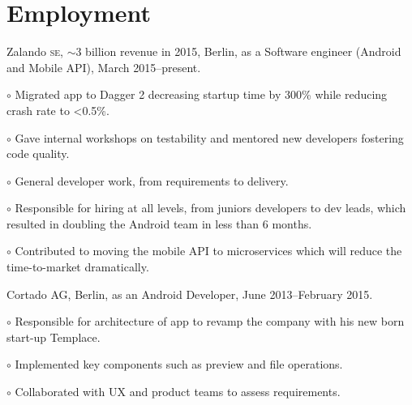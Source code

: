 \documentclass[letterpaper]{article}
\renewenvironment{itemize}{
  \begin{list}{}{
    \setlength{\leftmargin}{1.5em}
  }
}{
  \end{list}
}
\begin{document}
\section*{Employment}
\begin{itemize}
\item Zalando \textsc{se}, {$\scriptstyle\sim$}3 billion revenue in 2015, Berlin, as a Software engineer (Android and Mobile API), March 2015--present. 
\begin{itemize}
	\item $\circ$ Migrated app to Dagger 2 decreasing startup time by 300\% while reducing crash rate to <0.5\%.
	\item $\circ$ Gave internal workshops on testability and mentored new developers fostering code quality.
	\item $\circ$ General developer work, from requirements to delivery.
	\item $\circ$ Responsible for hiring at all levels, from juniors developers to dev leads, which resulted in doubling the Android team in less than 6 months.
	\item $\circ$ Contributed to moving the mobile API to microservices which will reduce the time-to-market dramatically.
	
	
\end{itemize}
\item Cortado AG, Berlin, as an Android Developer, June 2013--February 2015.
\begin{itemize}
     \item $\circ$ Responsible for architecture of app to revamp the company with his new born start-up Templace.
     \item $\circ$ Implemented key components such as preview and file operations.
     \item $\circ$ Collaborated with UX and product teams to assess requirements.
     
      

\end{itemize}
\end{itemize}
\end{document}
